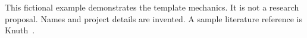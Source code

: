 This fictional example demonstrates the template mechanics. It is not a research proposal. Names and project details are invented. A sample literature reference is Knuth~\cite{knuth1984}.

